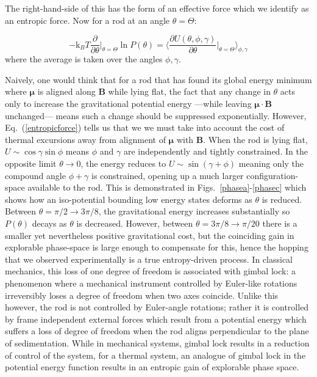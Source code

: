\documentclass[aps,prl,twocolumn,superscriptaddress]{revtex4-1}
\newcommand{\vcrm}[1]{\mathbf{#1}}
\newcommand{\vc}[1]{\boldsymbol{#1}}
\newcommand{\kk}{\mathrm{k}_B}
\begin{document}
The right-hand-side of this has the form of an effective force which we identify as an entropic force. Now for a rod at an angle $\theta=\Theta$:

\begin{equation} \label{entropicforce}
-\kk T\frac{\partial }{\partial \theta}\Big|_{\theta=\Theta} \ln{P(\theta)}  = \Big\langle \frac{\partial U(\theta,\phi,\gamma)}{\partial \theta}\Big|_{\theta=\Theta} \Big\rangle_{\phi,\gamma}
\end{equation}where the average is taken over the angles $\phi,\gamma$.

Naively, one would think that for a rod that has found its global energy minimum where $\vc{\mu}$ is aligned along $\vcrm{B}$ while lying flat, the fact that any change in $\theta$ acts only to increase the gravitational potential energy ---while leaving $\vc{\mu}\cdot\vcrm{B} $ unchanged--- means such a change should be suppressed exponentially. However, Eq.\ (\ref{entropicforce}) tells us that we we must take into account the cost of thermal excursions away from alignment of $\vc{\mu}$ with $\vcrm{B}$. When the rod is lying flat, $U\sim \cos\gamma\sin\phi$ means $\phi$ and $\gamma$ are independently and tightly constrained. In the opposite limit $\theta\rightarrow0$, the energy reduces to $U\sim \sin(\gamma+\phi)$ meaning only the compound angle $\phi+\gamma$ is constrained, opening up a much larger configuration-space available to the rod. This is demonstrated in Figs.\ \ref{phasea}-\ref{phasec} which shows how an iso-potential bounding low energy states deforms as $\theta$ is reduced. Between $\theta=\pi/2\rightarrow 3\pi/8$, the gravitational energy increases substantially so $P(\theta)$ decays as $\theta$ is decreased. However, between $\theta=3\pi/8\rightarrow\pi/20$ there is a smaller yet nevertheless positive gravitational cost, but the coinciding gain in explorable phase-space is large enough to compensate for this, hence the hopping that we observed experimentally is a true entropy-driven process. In classical mechanics, this loss of one degree of freedom is associated with gimbal lock: a phenomenon where a mechanical instrument controlled by Euler-like rotations irreversibly loses a degree of freedom when two axes coincide. Unlike this however, the rod is not controlled by Euler-angle rotations; rather it is controlled by frame independent external forces which result from a potential energy which suffers a loss of degree of freedom when the rod aligns perpendicular to the plane of sedimentation. While in mechanical systems, gimbal lock results in a reduction of control of the system, for a thermal system, an analogue of gimbal lock in the potential energy function results in an entropic gain of explorable phase space.
\end{document}
